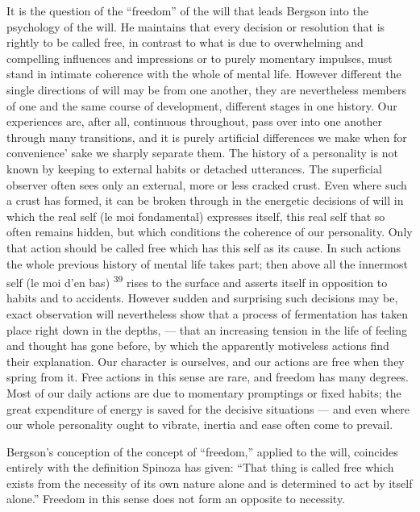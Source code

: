 \documentclass[12pt,a4paper,openany]{book}
\newcommand{\opage}[1]{\marginnote{\footnotesize\textit{[#1]}}}
\newcommand{\nm}[1]{\unskip\textsuperscript{#1}}
\begin{document}
It is the question of the ``freedom'' of the will that leads Bergson into the psychology of the will. He maintains that every decision or resolution that is rightly to be called free, in contrast to what is due to overwhelming and compelling influences and impressions or to purely momentary impulses, must stand in intimate coherence with the whole of mental life. However different the single directions of will may be from one another, they are nevertheless members of one and the same course of
\opage{45}development, different stages in one history. Our experiences are, after all, continuous throughout, pass over into one another through many transitions, and it is purely artificial differences we make when for convenience' sake we sharply separate them. The history of a personality is not known by keeping to external habits or detached utterances. The superficial observer often sees only an external, more or less cracked crust. Even where such a crust has formed, it can be broken through in the energetic decisions of will in which the real self (le moi fondamental) expresses itself, this real self that so often remains hidden, but which conditions the coherence of our personality. Only that action should be called free which has this self as its cause. In such actions the whole previous history of mental life takes part; then above all the innermost self (le moi d'en bas) \nm{39} rises to the surface and asserts itself in opposition to habits and to accidents. However sudden and surprising such decisions may be, exact observation will nevertheless show that a process of fermentation has taken place right down in the depths, --- that an increasing tension in the life of feeling and thought has gone before, by which the apparently motiveless actions find their explanation. Our character is ourselves, and our actions are free when they spring from it. Free actions in this sense are rare, and freedom has many degrees. Most of our daily actions are due to momentary promptings or fixed habits; the great expenditure of energy is saved for the decisive situations --- and even where our whole personality ought to vibrate, inertia and ease often come to prevail.

Bergson's conception of the concept of ``freedom,'' applied to the will, coincides entirely with the definition Spinoza has given: ``That thing is called free which exists from the necessity of its own nature alone and is determined to act by itself alone.'' Freedom in this sense does not form an opposite to necessity.
\end{document}
